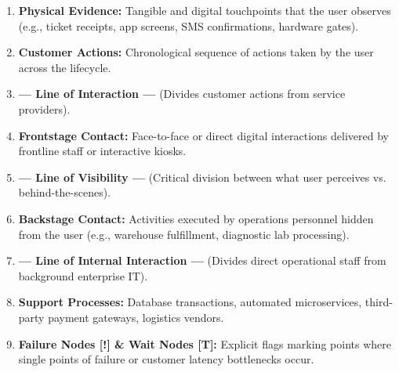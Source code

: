 \begin{methodbox}
\begin{enumerate}[leftmargin=1.5em]
    \item \textbf{Physical Evidence:} Tangible and digital touchpoints that the user observes (e.g., ticket receipts, app screens, SMS confirmations, hardware gates).
    \item \textbf{Customer Actions:} Chronological sequence of actions taken by the user across the lifecycle.
    \item \textbf{--- Line of Interaction ---} (Divides customer actions from service providers).
    \item \textbf{Frontstage Contact:} Face-to-face or direct digital interactions delivered by frontline staff or interactive kiosks.
    \item \textbf{--- Line of Visibility ---} (Critical division between what user perceives vs. behind-the-scenes).
    \item \textbf{Backstage Contact:} Activities executed by operations personnel hidden from the user (e.g., warehouse fulfillment, diagnostic lab processing).
    \item \textbf{--- Line of Internal Interaction ---} (Divides direct operational staff from background enterprise IT).
    \item \textbf{Support Processes:} Database transactions, automated microservices, third-party payment gateways, logistics vendors.
    \item \textbf{Failure Nodes [!] \& Wait Nodes [T]:} Explicit flags marking points where single points of failure or customer latency bottlenecks occur.
\end{enumerate}
\end{methodbox}

